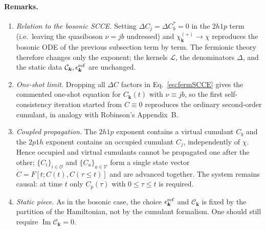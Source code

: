 \paragraph{Remarks.}
\begin{enumerate}
\item \emph{Relation to the bosonic SCCE.} Setting $\Delta C_j=\Delta C_b^*=0$ in the $2h1p$ term (i.e.\ leaving the quasiboson $\nu=jb$ undressed) and $\chi^{(+)}_{\bm k}\to\chi$ reproduces the bosonic ODE of the previous subsection term by term. The fermionic theory therefore changes only the exponent; the kernels $\mathcal{L}$, the denominators $\Delta$, and the static data $\mathcal{C}_{\bm{k}},\epsilon^{\rm ref}_{\bm{k}}$ are unchanged.
\item \emph{One-shot limit.} Dropping all $\Delta C$ factors in Eq.~\eqref{eq:fermSCCE} gives the commented one-shot equation for $C_{\bm{k}}(t)$ with $\nu\equiv jb$, so the first self-consistency iteration started from $C\equiv0$ reproduces the ordinary second-order cumulant, in analogy with Robinson's Appendix~B.
\item \emph{Coupled propagation.} The $2h1p$ exponent contains a virtual cumulant $C_b$ and the $2p1h$ exponent contains an occupied cumulant $C_j$, independently of $\chi$. Hence occupied and virtual cumulants cannot be propagated one after the other; $\{C_i\}_{i\in\mathcal{O}}$ and $\{C_a\}_{a\in\mathcal{V}}$ form a single state vector $\dot{C}=F[t;C(t),C(\tau\le t)]$ and are advanced together. The system remains causal: at time $t$ only $C_p(\tau)$ with $0\le\tau\le t$ is required.
\item \emph{Static piece.} As in the bosonic case, the choice $\epsilon^{\rm ref}_{\bm{k}}$ and $\mathcal{C}_{\bm{k}}$ is fixed by the partition of the Hamiltonian, not by the cumulant formalism. One should still require $\operatorname{Im}\mathcal{C}_{\bm{k}}=0$.
\end{enumerate}

